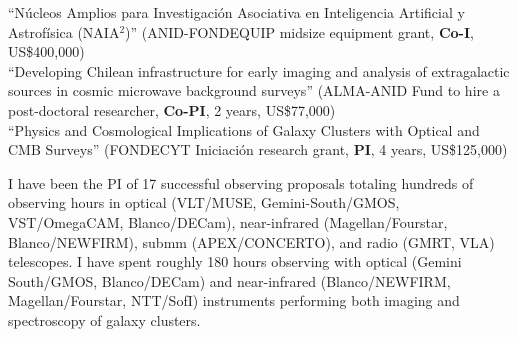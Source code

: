 \documentclass[11pt]{article}
\begin{document}
\hline



\noindent
{} ``Núcleos Amplios para Investigación Asociativa en Inteligencia Artificial y Astrofísica (NAIA$^2$)'' (ANID-FONDEQUIP midsize equipment grant, \textbf{Co-I}, US\$400,000)\\
 ``Developing Chilean infrastructure for early imaging and analysis of
extragalactic sources in cosmic microwave background surveys'' (ALMA-ANID Fund to hire a post-doctoral researcher, \textbf{Co-PI}, 2 years, US\$77,000)\\
 ``Physics and Cosmological Implications of Galaxy Clusters with Optical and CMB Surveys'' (FONDECYT Iniciaci\'on research grant, \textbf{PI}, 4 years, US\$125,000)



%

\noindent
I have been the PI of 17 successful observing proposals totaling hundreds of 
observing hours in optical (VLT/MUSE, Gemini-South/GMOS, VST/OmegaCAM, Blanco/DECam), near-infrared 
(Magellan/Fourstar, Blanco/NEWFIRM), submm (APEX/CONCERTO), and radio (GMRT, VLA) telescopes. 
I have spent roughly 180 hours observing with 
optical (Gemini South/GMOS, Blanco/DECam) and near-infrared (Blanco/NEWFIRM, Magellan/Fourstar, NTT/SofI) instruments performing both imaging and spectroscopy of galaxy clusters.\\


%

\end{document}

